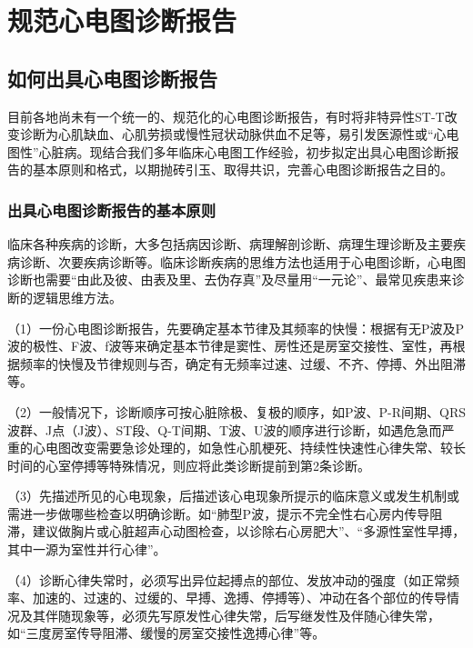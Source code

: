 \protect\hypertarget{text00057.htmlux5cux23chapter57}{}{}

\chapter{规范心电图诊断报告}

\protect\hypertarget{text00057.htmlux5cux23subid676}{}{}

\section{如何出具心电图诊断报告}

目前各地尚未有一个统一的、规范化的心电图诊断报告，有时将非特异性ST-T改变诊断为心肌缺血、心肌劳损或慢性冠状动脉供血不足等，易引发医源性或“心电图性”心脏病。现结合我们多年临床心电图工作经验，初步拟定出具心电图诊断报告的基本原则和格式，以期抛砖引玉、取得共识，完善心电图诊断报告之目的。

\protect\hypertarget{text00057.htmlux5cux23subid677}{}{}

\subsection{出具心电图诊断报告的基本原则}

临床各种疾病的诊断，大多包括病因诊断、病理解剖诊断、病理生理诊断及主要疾病诊断、次要疾病诊断等。临床诊断疾病的思维方法也适用于心电图诊断，心电图诊断也需要“由此及彼、由表及里、去伪存真”及尽量用“一元论”、最常见疾患来诊断的逻辑思维方法。

（1）一份心电图诊断报告，先要确定基本节律及其频率的快慢：根据有无P波及P波的极性、F波、f波等来确定基本节律是窦性、房性还是房室交接性、室性，再根据频率的快慢及节律规则与否，确定有无频率过速、过缓、不齐、停搏、外出阻滞等。

（2）一般情况下，诊断顺序可按心脏除极、复极的顺序，如P波、P-R间期、QRS波群、J点（J波）、ST段、Q-T间期、T波、U波的顺序进行诊断，如遇危急而严重的心电图改变需要急诊处理的，如急性心肌梗死、持续性快速性心律失常、较长时间的心室停搏等特殊情况，则应将此类诊断提前到第2条诊断。

（3）先描述所见的心电现象，后描述该心电现象所提示的临床意义或发生机制或需进一步做哪些检查以明确诊断。如“肺型P波，提示不完全性右心房内传导阻滞，建议做胸片或心脏超声心动图检查，以诊除右心房肥大”、“多源性室性早搏，其中一源为室性并行心律”。

（4）诊断心律失常时，必须写出异位起搏点的部位、发放冲动的强度（如正常频率、加速的、过速的、过缓的、早搏、逸搏、停搏等）、冲动在各个部位的传导情况及其伴随现象等，必须先写原发性心律失常，后写继发性及伴随心律失常，如“三度房室传导阻滞、缓慢的房室交接性逸搏心律”等。

